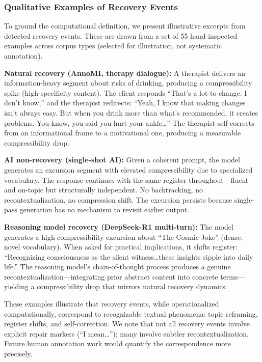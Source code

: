 \documentclass[11pt]{article}
\begin{document}
\subsubsection{Qualitative Examples of Recovery Events}
\label{sec:qualitative}

To ground the computational definition, we present illustrative excerpts from detected recovery events. These are drawn from a set of 55 hand-inspected examples across corpus types (selected for illustration, not systematic annotation).

\textbf{Natural recovery (AnnoMI, therapy dialogue):} A therapist delivers an information-heavy segment about risks of drinking, producing a compressibility spike (high-specificity content). The client responds ``That's a lot to change. I don't know,'' and the therapist redirects: ``Yeah, I know that making changes isn't always easy. But when you drink more than what's recommended, it creates problems. You know, you said you hurt your ankle\ldots'' The therapist self-corrects from an informational frame to a motivational one, producing a measurable compressibility drop.

\textbf{AI non-recovery (single-shot AI):} Given a coherent prompt, the model generates an excursion segment with elevated compressibility due to specialized vocabulary. The response continues with the same register throughout---fluent and on-topic but structurally independent. No backtracking, no recontextualization, no compression shift. The excursion persists because single-pass generation has no mechanism to revisit earlier output.

\textbf{Reasoning model recovery (DeepSeek-R1 multi-turn):} The model generates a high-compressibility excursion about ``The Cosmic Joke'' (dense, novel vocabulary). When asked for practical implications, it shifts register: ``Recognizing consciousness as the silent witness\ldots these insights ripple into daily life.'' The reasoning model's chain-of-thought process produces a genuine recontextualization---integrating prior abstract content into concrete terms---yielding a compressibility drop that mirrors natural recovery dynamics.

These examples illustrate that recovery events, while operationalized computationally, correspond to recognizable textual phenomena: topic reframing, register shifts, and self-correction. We note that not all recovery events involve explicit repair markers (``I mean\ldots''); many involve subtler recontextualization. Future human annotation work would quantify the correspondence more precisely.
\end{document}
